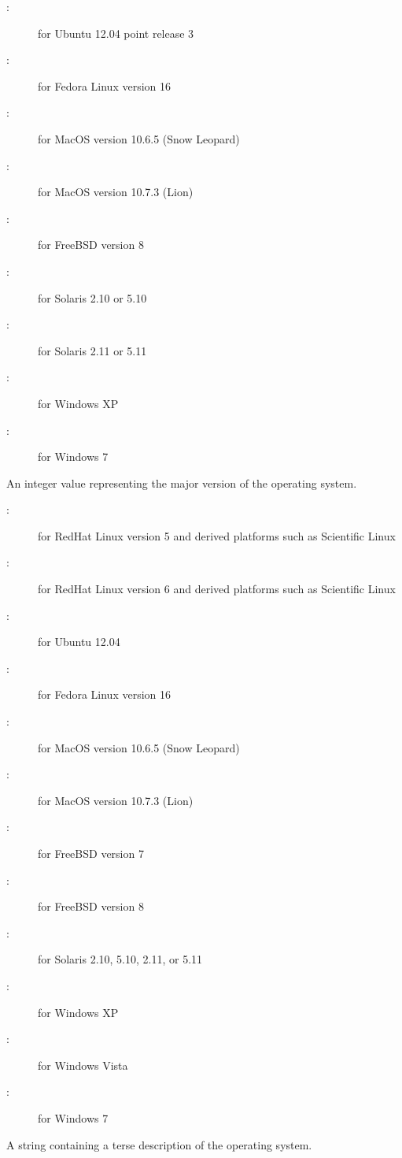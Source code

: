 \begin{description}
\begin{description}
	\item[:] for Ubuntu 12.04 point release 3 
	\item[:] for Fedora Linux version 16
	\item[:] for MacOS version 10.6.5 (Snow Leopard)
	\item[:] for MacOS version 10.7.3 (Lion)
	\item[:] for FreeBSD version 8
	\item[:] for Solaris 2.10 or 5.10
	\item[:] for Solaris 2.11 or 5.11
	\item[:] for Windows XP
	\item[:] for Windows 7
	\end{description}
%
\item[\AdAttr{OpSysMajorVersion}:] An integer value representing the major version of the operating system.
	\begin{description}
	\item[:] for RedHat Linux version 5 
and derived platforms such as Scientific Linux
	\item[:] for RedHat Linux version 6
and derived platforms such as Scientific Linux
	\item[:] for Ubuntu 12.04
	\item[:] for Fedora Linux version 16
	\item[:] for MacOS version 10.6.5 (Snow Leopard)
	\item[:] for MacOS version 10.7.3 (Lion)
	\item[:] for FreeBSD version 7
	\item[:] for FreeBSD version 8
	\item[:] for Solaris 2.10, 5.10, 2.11, or 5.11
	\item[:] for Windows XP
	\item[:] for Windows Vista
	\item[:] for Windows 7
	\end{description}
%
\item[\AdAttr{OpSysName}:] A string containing a terse description of the operating system.
	\begin{description}

\end{description}
\end{description}
